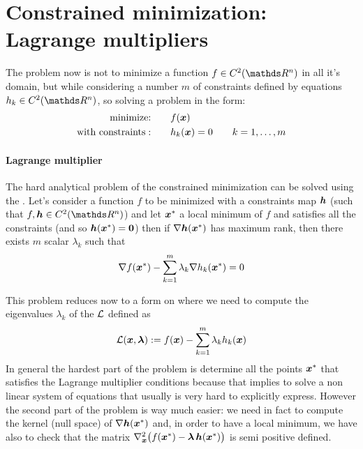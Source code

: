 \section{Constrained minimization: Lagrange multipliers} \label{sec:min:constrainedmin}
	The problem now is not to minimize a function $f\in C^2(\R^n)$ in all it's domain, but while considering a number $m$ of constraints defined by equations $h_k\in C^2(\R^n)$, so solving a problem in the form:
	\begin{align*}
		\textrm{minimize:} \qquad & f(\boldsymbol{x}) \\
		\textrm{with constraints}: \qquad & h_k(\boldsymbol{x}) = 0 \qquad k = 1,\dots, m
	\end{align*}
	
	\paragraph{Lagrange multiplier} The hard analytical problem of the constrained minimization can be solved using the . Let's consider a function $f$ to be minimized with a constraints map $\boldsymbol{h}$ (such that $f,\vett h \in C^2(\R^n)$) and let $\boldsymbol{x}^*$ a local minimum of $f$ and satisfies all the constraints (and so $\boldsymbol{h}(\boldsymbol{x}^*) = \boldsymbol{0}$) then if $\nabla \boldsymbol{h}(\boldsymbol{x}^*)$ has maximum rank, then there exists $m$ scalar $\lambda_k$ such that
	\begin{equation}
		\nabla f(\boldsymbol{x}^*) - \sum_{k=1}^{m} \lambda_k \nabla h_k(\boldsymbol{x}^*) = 0
	\end{equation}
	
	This problem reduces now to a form on where we need to compute the eigenvalues $\lambda_k$ of the  $\mathcal L$ defined as 
	\begin{equation}
		\mathcal L (\boldsymbol{x},\boldsymbol{\lambda}) := f(\boldsymbol{x}) - \sum_{k=1}^m \lambda_k h_k(\boldsymbol{x}) 
	\end{equation}
	In general the hardest part of the problem is determine all the points $\boldsymbol{x}^*$ that satisfies the Lagrange multiplier conditions because that implies to solve a non linear system of equations that usually is very hard to explicitly express. However the second part of the problem is way much easier: we need in fact to compute the kernel (null space) of $\nabla \boldsymbol{h}(\boldsymbol{x}^*)$ and, in order to have a local minimum, we have also to check that the matrix $\nabla_{\boldsymbol{x}} ^2\big(f(\boldsymbol{x}^*) - \boldsymbol{\lambda} \, \boldsymbol{h}(\boldsymbol{x}^*)\big)$ is semi positive defined. \vspace{3mm}
	
